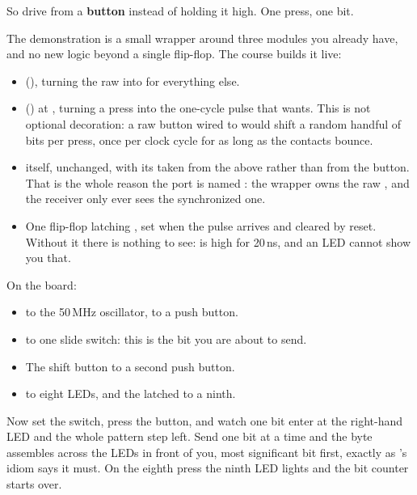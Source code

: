 So drive  from a \textbf{button} instead of holding it high. One press, one bit.

The demonstration is a small wrapper around three modules you already have, and no new logic
beyond a single flip-flop. The course builds it live:
\begin{itemize}
  \item {} (), turning the raw  into
     for everything else.
  \item {} () at , turning a press into the
    one-cycle pulse that  wants. This is not optional decoration: a raw button
    wired to  would shift a random handful of bits per press, once per clock
    cycle for as long as the contacts bounce.
  \item {} itself, unchanged, with its  taken from the
     above rather than from the button. That is the whole reason the port is named
    : the wrapper owns the raw , and the receiver only ever sees the
    synchronized one.
  \item One flip-flop latching , set when the pulse arrives and cleared by reset.
    Without it there is nothing to see:  is high for 20\,ns, and an LED cannot
    show you that.
\end{itemize}
On the board:
\begin{itemize}
  \item {} to the 50\,MHz oscillator,  to a push button.
  \item {} to one slide switch: this is the bit you are about to send.
  \item The shift button to a second push button.
  \item {} to eight LEDs, and the latched  to a ninth.
\end{itemize}
Now set the switch, press the button, and watch one bit enter at the right-hand LED and the whole
pattern step left. Send  one bit at a time and the byte assembles across the LEDs in
front of you, most significant bit first, exactly as 's idiom says it must. On the
eighth press the ninth LED lights and the bit counter starts over.

